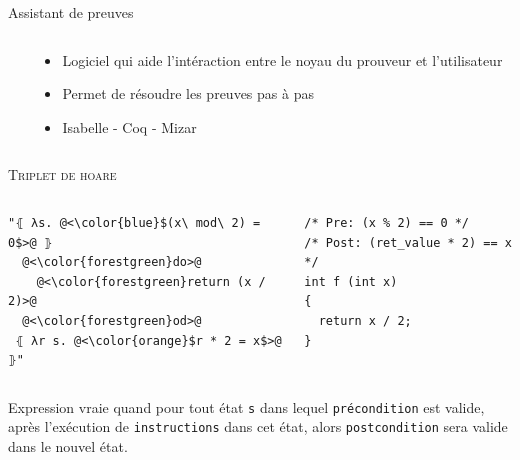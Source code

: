 \documentclass[hyperref={pdfpagelabels=false}]{beamer}
\begin{document}
\begin{frame}[fragile]{Assistant de preuves}
  \begin{columns}[T] %
    \begin{column}{.50\textwidth}
    \end{column}%
    \hfill%
    \begin{column}{.50\textwidth}
      \begin{itemize}
        \item Logiciel qui aide l'intéraction entre le noyau du prouveur et l'utilisateur
        \item Permet de résoudre les preuves pas à pas
        \item Isabelle - Coq - Mizar
      \end{itemize}
    \end{column}%
  \end{columns}
\end{frame}

\begin{frame}[fragile]
  \textsc{Triplet de hoare}
  \begin{columns}[T] %
    \begin{column}{.4\textwidth}
      \begin{lstlisting}
"⦃ λs. @<\color{blue}$(x\ mod\ 2) = 0$>@ ⦄
  @<\color{forestgreen}do>@
    @<\color{forestgreen}return (x / 2)>@
  @<\color{forestgreen}od>@
 ⦃ λr s. @<\color{orange}$r * 2 = x$>@ ⦄"
      \end{lstlisting}
    \end{column}
    \begin{column}{.5\textwidth}
      \begin{verbatim}
/* Pre: (x % 2) == 0 */
/* Post: (ret_value * 2) == x */
int f (int x)
{
  return x / 2;
}
      \end{verbatim}
    \end{column}
  \end{columns}
  Expression vraie quand pour tout état \texttt{s} dans lequel \texttt{\color{blue}précondition} est valide, après l'exécution de \texttt{\color{forestgreen}instructions} dans cet état, alors \texttt{\color{orange}postcondition} sera valide dans le nouvel état.
\end{frame}
\end{document}
